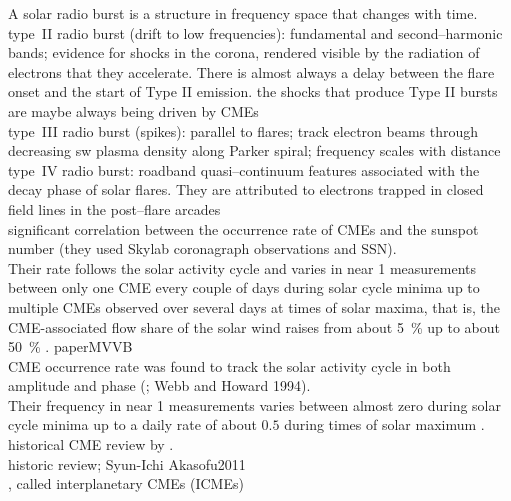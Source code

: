 A solar radio burst is a structure in frequency space that changes with time.\\
type~II radio burst (drift to low frequencies): fundamental and second–harmonic bands; evidence for shocks in the corona, rendered visible by the radiation of electrons that they accelerate. There is almost always a delay between the flare onset and the start of Type II emission. the shocks that produce Type II bursts are maybe always being driven by CMEs\\
type~III radio burst (spikes): parallel to flares; track electron beams through decreasing sw plasma density along Parker spiral; frequency scales with distance\\
type~IV radio burst: roadband quasi–continuum features associated with the decay phase of solar flares. They are attributed to electrons trapped in closed field lines in the post–flare arcades\\


significant correlation between the occurrence rate of CMEs and the sunspot number \citep{Hildner1976} (they used Skylab coronagraph observations and SSN).\\
Their rate follows the solar activity cycle and varies in near \SI{1}{\au} measurements between only one CME every couple of days during solar cycle minima up to multiple CMEs observed over several days at times of solar maxima, that is, the CME-associated flow share of the solar wind raises from about \SI{5}{\percent} up to about \SI{50}{\percent} \citep{Richardson2012}. paperMVVB\\
CME occurrence rate was found to track the solar activity cycle in both amplitude and phase (\citep{Webb1991}; Webb and Howard 1994).\\
Their frequency in near \SI{1}{\au} measurements varies between almost zero during solar cycle minima up to a daily rate of about $0.5$ during times of solar maximum  \citep{Richardson2012}.\\



historical CME review by \citet{Gopalswamy2016}.\\
historic review; Syun-Ichi Akasofu2011\\

, called interplanetary CMEs (ICMEs)\\

